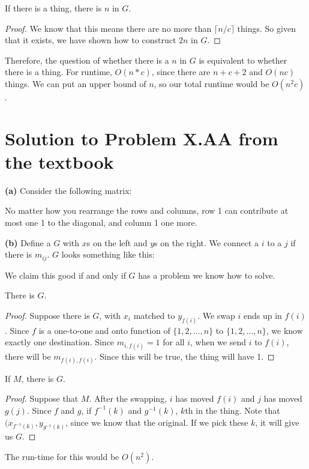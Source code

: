 \documentclass[11pt]{article}
\begin{document}
\begin{claim} 
If there is a thing, there is $n$ in $G$. 
\end{claim}
\begin{proof}
We know that this means there are no more than $\lceil n/c \rceil$ things. So given that it exists, we have shown how to construct $2n$ in $G$.
\end{proof}
Therefore, the question of whether there is a $n$ in $G$ is equivalent to whether there is a thing. For runtime, $O(n*c)$, since there are $n+c+2$ and $O(nc)$ things. We can put an upper bound of $n$, so our total runtime would be $O(n^{2}c)$.


\section*{Solution to Problem X.AA from the textbook}

\textbf{(a)} Consider the following matrix:


No matter how you rearrange the rows and columns, row 1 can contribute at most one 1 to the diagonal, and column 1 one more.

\textbf{(b)}
Define a $G$ with $x$s on the left and $y$s on the right. We connect a $i$ to a $j$ if there is $m_{ij}$. $G$ looks something like this:


We claim this good if and only if $G$ has a problem we know how to solve.
\begin{claim} 
There is $G$. 
\end{claim}
\begin{proof}
Suppose there is $G$, with $x_{i}$ matched to $y_{f(i)}$. We swap $i$ ends up in $f(i)$. Since $f$ is a one-to-one and onto function of $\{1,2,\ldots,n\}$ to $\{1,2,\ldots,n\}$, we know exactly one destination. Since $m_{i,f(i)} = 1$ for all $i$, when we send $i$ to $f(i)$, there will be $m_{f(i),f(i)}$. Since this will be true, the thing will have 1.
\end{proof}
\begin{claim} 
If $M$, there is $G$. 
\end{claim}
\begin{proof}
Suppose that $M$. After the swapping, $i$ has moved $f(i)$ and $j$ has moved $g(j)$. Since $f$ and $g$, if $f^{-1}(k)$ and $g^{-1}(k)$, $k$th in the thing. Note that $(x_{f^{-1}(k)}, y_{g^{-1}(k)}$, since we know that the original. If we pick these $k$, it will give us $G$. 
\end{proof}

The run-time for this would be $O(n^2)$.
\end{document}
